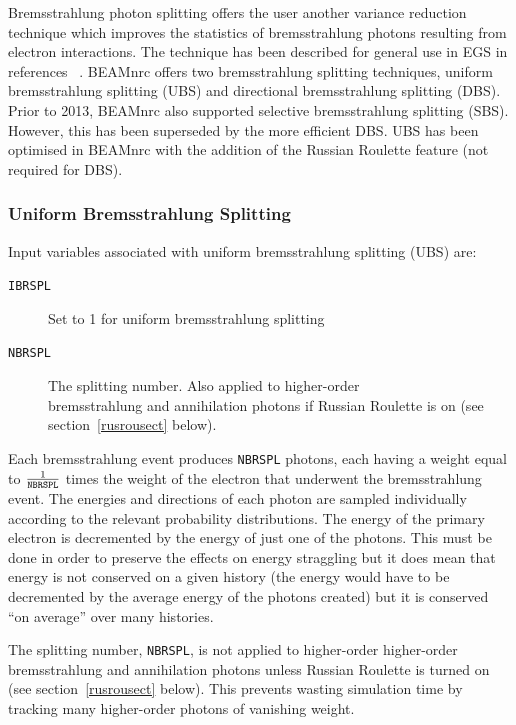 \documentclass[12pt,twoside]{article}
\begin{document}
Bremsstrahlung photon splitting offers the user another variance
reduction technique which improves the statistics of
bremsstrahlung photons resulting from electron interactions.
The technique has been described for general use in EGS in
references~ \cite{Bi89,RB90}.  BEAMnrc offers two bremsstrahlung splitting
techniques, uniform bremsstrahlung splitting (UBS) and
directional bremsstrahlung splitting (DBS).  Prior to 2013, BEAMnrc
also supported selective bremsstrahlung splitting (SBS).  However,
this has been superseded by the more efficient DBS.  UBS
has been
optimised in BEAMnrc with the addition of the Russian Roulette feature
(not required for DBS).

\subsubsection{Uniform Bremsstrahlung Splitting}

Input variables associated with uniform bremsstrahlung splitting (UBS) are:
\begin{description}
\item [{\tt IBRSPL}] Set to 1 for uniform bremsstrahlung splitting
\item [{\tt NBRSPL}] The splitting number.  Also applied to higher-order\\
bremsstrahlung and annihilation photons if Russian Roulette
is on (see section~\ref{rusrousect} below).
\end{description}

Each bremsstrahlung event produces {\tt NBRSPL} photons, each having a weight
equal to $\frac{1}{{\tt NBRSPL}}$ times the weight of the electron that
underwent the bremsstrahlung event.  The energies and directions of each
photon are sampled individually according to the relevant probability
distributions.  The energy of the primary electron is decremented by
the energy of just one of the photons.  This must be done in order to
preserve the effects on energy straggling but it does mean that energy is
not conserved on a given history (the energy would have to be decremented
by the average energy of the photons created) but it is conserved ``on
average'' over many histories.

The splitting number, {\tt NBRSPL}, is not applied to higher-order
higher-order bremsstrahlung and annihilation photons unless
Russian Roulette is turned on (see section~\ref{rusrousect}
below).  This prevents wasting simulation time by tracking many
higher-order photons of vanishing weight.
\end{document}
